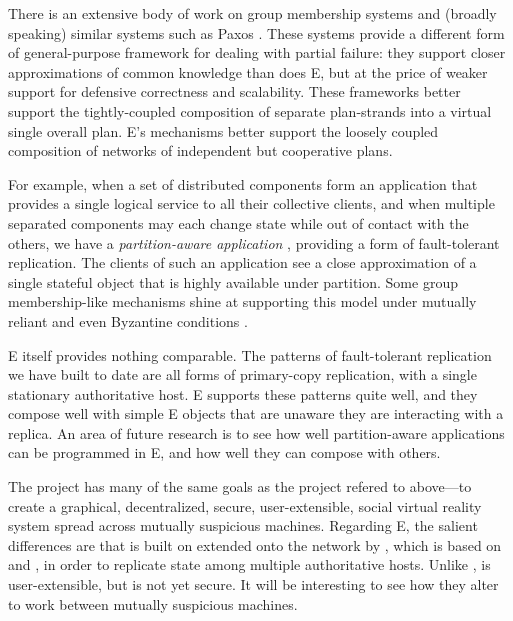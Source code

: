 \documentclass{llncs}
\begin{document}
 There is an extensive body of work on
group membership systems \cite{birman:vsync,amir:thesis} and (broadly
speaking) similar systems such as Paxos \cite{lamport:paxos}. These
systems provide a different form of general-purpose framework for
dealing with partial failure: they support closer approximations of
common knowledge than does E, but at the price of weaker support for
defensive correctness and scalability. These frameworks better support
the tightly-coupled composition of separate plan-strands into a
virtual single overall plan. E's mechanisms better support the loosely
coupled composition of networks of independent but cooperative plans.

For example, when a set of distributed components form an application
that provides a single logical service to all their collective
clients, and when multiple separated components may each change state
while out of contact with the others, we have a \emph{partition-aware
application} \cite{partition-aware,bancomat}, providing a form of
fault-tolerant replication. The clients of such an application see a
close approximation of a single stateful object that is highly
available under partition. Some group membership-like mechanisms shine
at supporting this model under mutually reliant and even Byzantine
conditions \cite{castro:bft}.

E itself provides nothing comparable. The patterns of fault-tolerant
replication we have built to date are all forms of primary-copy
replication, with a single stationary authoritative host. E supports
these patterns quite well, and they compose well with simple E objects
that are unaware they are interacting with a replica. An area of
future research is to see how well partition-aware applications can be
programmed in E, and how well they can compose with others.

 The  project has
many of the same goals as the  project refered to
above---to create a graphical, decentralized, secure, user-extensible,
social virtual reality system spread across mutually suspicious
machines. Regarding E, the salient differences are that 
is built on  extended onto the network by
, which is based on  \cite{reed:namos} and
 \cite{lamport:paxos}, in order to replicate state among
multiple authoritative hosts. Unlike ,  is
user-extensible, but is not yet secure. It will be interesting to see
how they alter  to work between mutually suspicious
machines.
\end{document}
